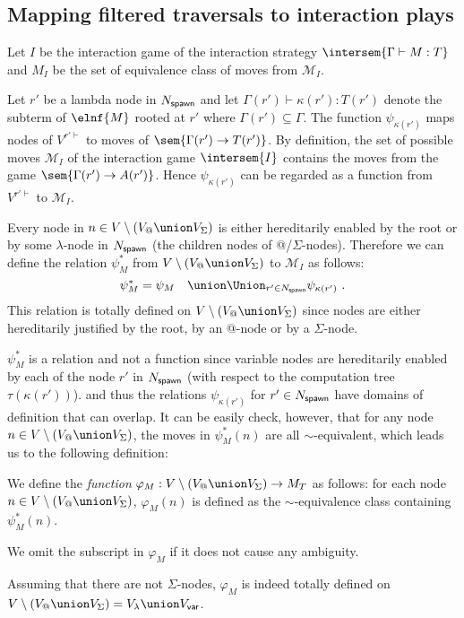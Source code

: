 \subsection{Mapping filtered traversals to interaction plays}

    Let $I$ be the interaction game of the interaction strategy $\intersem{\Gamma \vdash M : T}$ and
    $M_I$ be the set of equivalence class of moves from $\mathcal{M}_I$.

    Let $r'$ be a lambda node in $N_{\sf spawn}$ and let $\Gamma(r') \vdash \kappa(r') : T(r')$ denote the subterm of $\elnf{M}$ rooted at $r'$ where $\Gamma(r')\subseteq \Gamma$.
    The function $\psi_{\kappa(r')}$ maps nodes of $V^{r'\vdash}$
    to moves of $\sem{\Gamma(r') \rightarrow T(r')}$. By definition,
    the set of possible moves $\mathcal{M}_I$ of the interaction game $\intersem{I}$ contains the
    moves from the game $\sem{\Gamma(r') \rightarrow A(r')}$. Hence $\psi_{\kappa(r')}$ can be regarded as a function from $V^{r'\vdash}$ to $\mathcal{M}_I$.

    Every node in $n \in V\setminus (V_@ \union V_\Sigma)$ is either hereditarily enabled by the root or by some $\lambda$-node in $N_{\sf spawn}$ (the children nodes of @/$\Sigma$-nodes). Therefore we can define the relation $\psi^*_M$ from
    $V\setminus (V_@ \union V_\Sigma)$ to $\mathcal{M}_I$ as follows:
    $$ \psi^*_M = \psi_{M} \quad \union \Union_{r' \in N_{\sf spawn}} \psi_{\kappa(r')} \ .$$
    This relation is totally defined on $V\setminus (V_@ \union V_\Sigma)$ since nodes are either hereditarily justified by the root, by an @-node or by a $\Sigma$-node.

    $\psi^*_M$ is a relation and not a function since variable nodes are hereditarily enabled by
    each of the node $r'$ in $N_{\sf spawn}$ (with respect to the computation tree $\tau(\kappa(r'))$).
    and thus the relations $\psi_{\kappa(r')}$ for $r' \in N_{\sf spawn}$ have domains of definition that can overlap.
    It can be easily check, however, that for any node $n \in V\setminus (V_@ \union V_\Sigma)$,
    the moves in $\psi^*_M (n)$ are all $\sim$-equivalent, which leads us to the following definition:
    \begin{definition}
        \label{def:phi mapping}
        We define the \emph{function}
        $\varphi_M:V\setminus (V_@ \union V_\Sigma) \rightarrow M_T$ as follows: for each node $n \in V\setminus (V_@ \union V_\Sigma)$,
        $\varphi_M(n)$ is defined as the $\sim$-equivalence class containing $\psi^*_M (n)$.

        We omit the subscript in $\varphi_M$ if it does not cause any ambiguity.
    \end{definition}
    Assuming that there are not $\Sigma$-nodes, $\varphi_M$ is indeed totally defined on $V \setminus (V_@ \union V_\Sigma) = V_\lambda \union V_{\sf var}$.

